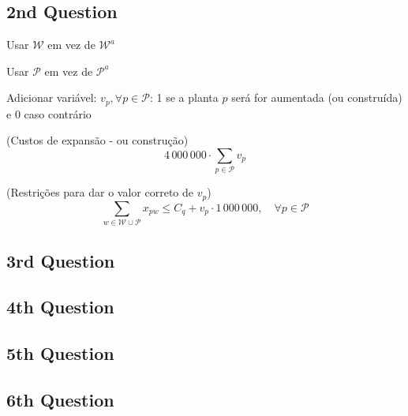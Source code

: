 \documentclass[12pt,a4paper]{article}
\begin{document}


\subsection{2nd Question}
\cite{states_centers}
\cite{ballou}

{
  \fontsize{28pt}{36pt}\selectfont
  Usar $\mathcal{W}$ em vez de $\mathcal{W}^{a}$

  Usar $\mathcal{P}$ em vez de $\mathcal{P}^{a}$


  Adicionar variável:
  $v_{p}, \forall p \in \mathcal{P}$: 1 se a planta $p$ será for
  aumentada (ou construída) e 0 caso contrário
}

\begin{center}
    (Custos de expansão - ou construção)
    \begin{equation*}
        4\,000\,000 \cdot \sum_{p \in \mathcal{P}} v_p
    \end{equation*}
\end{center}

\begin{center}
    (Restrições para dar o valor correto de $v_{p}$)
    \begin{equation}
        \sum_{w \in \mathcal{W} \cup \mathcal{P}} x_{pw} \leq C_q + v_p \cdot 1\,000\,000, \quad \forall p \in \mathcal{P}
    \end{equation}
\end{center}

\subsection{3rd Question}


\subsection{4th Question}


\subsection{5th Question}


\subsection{6th Question}



\end{document}

